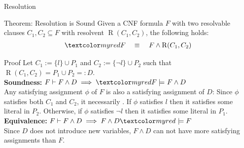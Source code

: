 \documentclass[t]{sdqbeamer}
\begin{document}
\begin{frame}{Resolution}
\begin{block}{Theorem: Resolution is Sound}
Given a CNF formula $F$ with two resolvable clauses $C_1, C_2 \subseteq F$ with resolvent $\operatorname{R}(C_1,C_2)$, the following holds:
\vspace*{-1ex}
\begin{align*}
	\highlo{F \quad \equiv~} \quad F \land \operatorname{R}(C_1,C_2)
\end{align*}
\end{block}
	
\begin{block}{Proof}
Let $C_1 := \{ l \} \cup P_1$ and $C_2 := \{ \lnot l \} \cup P_2$ such that $\operatorname{R}(C_1,C_2) = P_1 \cup P_2 =: D$.\\[1ex]

\textbf{Soundness:} $F \vdash F \land D \implies \highlo{F \models~} F \land D$ \\[.5ex]
Any satisfying assignment $\phi$ of $F$ is also a satisfying assignment of $D$:
Since $\phi$ satisfies both $C_1$ and $C_2$, it necessarily . If $\phi$ satisfies $l$ then it satisfies some literal in $P_2$. Otherwise, if $\phi$ satisfies $\lnot l$ then it satisfies some literal in $P_1$.\\[1ex]

\textbf{Equivalence:} $F \vdash F \land D \implies F \land D \highlo{~\models F}$ \\[.5ex]
Since $D$ does not introduce new variables, $F \wedge D$ can not have more satisfying assignments than $F$.
\end{block}
\end{frame}
	
\end{document}
